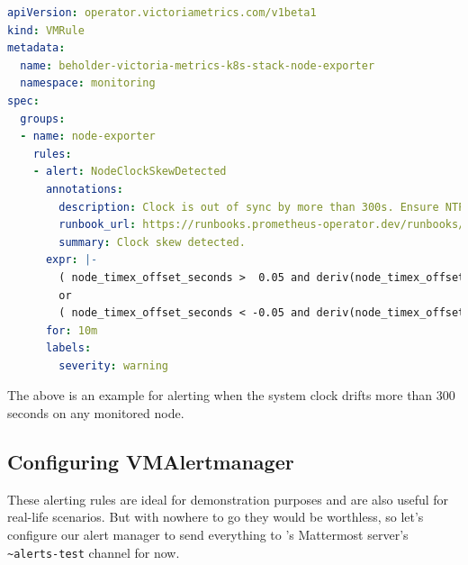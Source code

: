 \begin{lstlisting}[language=yaml,caption=Example alerting rule configuration]
apiVersion: operator.victoriametrics.com/v1beta1
kind: VMRule
metadata:
  name: beholder-victoria-metrics-k8s-stack-node-exporter
  namespace: monitoring
spec:
  groups:
  - name: node-exporter
    rules:
    - alert: NodeClockSkewDetected
      annotations:
        description: Clock is out of sync by more than 300s. Ensure NTP is configured correctly on this host.
        runbook_url: https://runbooks.prometheus-operator.dev/runbooks/node/nodeclockskewdetected
        summary: Clock skew detected.
      expr: |-
        ( node_timex_offset_seconds >  0.05 and deriv(node_timex_offset_seconds[5m]) >= 0 )
        or
        ( node_timex_offset_seconds < -0.05 and deriv(node_timex_offset_seconds[5m]) <= 0 )
      for: 10m
      labels:
        severity: warning
\end{lstlisting}

The above is an example for alerting when the system clock drifts more than 300
seconds on any monitored node.

\subsection{Configuring VMAlertmanager}

These alerting rules are ideal for demonstration purposes and are also useful
for real-life scenarios. But with nowhere to go they would be worthless, so
let's configure our alert manager to send everything to \kszk's Mattermost
server's \verb+~alerts-test+ channel for now.

